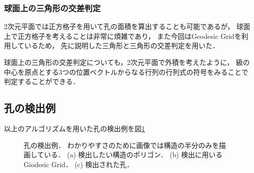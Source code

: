 \subsubsection{球面上の三角形の交差判定}
2次元平面では正方格子を用いて孔の面積を算出することも可能であるが，
球面上で正方格子を考えることは非常に煩雑であり，
また今回はGeodesic Gridを利用しているため，
先に説明した三角形と三角形の交差判定を用いた．

球面上の三角形の交差判定についても，2次元平面で外積を考えたように，
級の中心を原点とする3つの位置ベクトルからなる行列の行列式の符号をみることで判定することができる．



\subsection{孔の検出例}
以上のアルゴリズムを用いた孔の検出例を図\ref{fig:hole_detection}

\begin{figure}
\centering

\caption{
    孔の検出例．
    わかりやすさのために画像では構造の半分のみを描画している．
    (a) 検出したい構造のポリゴン．
    (b) 検出に用いるGiodesic Grid．
    (c) 検出された孔．
}
\label{fig:hole_detection}
\end{figure}
